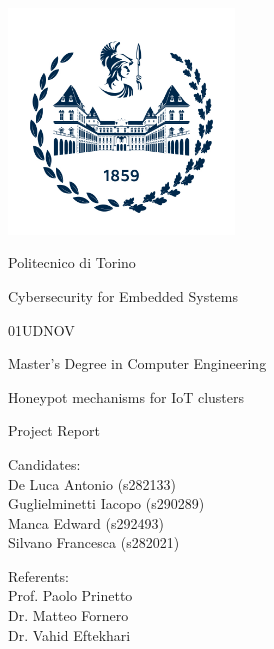 \documentclass[10pt,  english, makeidx, a4paper, titlepage, oneside]{book}
\begin{document}
\frontmatter
\begin{titlepage}
\vspace{0cm}
\centerline{
\includegraphics[width=6cm]{./logopolitonuovo}} 
\vspace{0.5cm}
\centerline{\LARGE Politecnico di Torino}
\vspace{2.5cm}
\centerline{\huge Cybersecurity for Embedded Systems}
\vspace{0.25cm}
\centerline{\huge 01UDNOV}
\vspace{1cm}
\centerline{\Large Master's Degree in Computer Engineering}
\vspace{2.5cm}
\centerline{\Huge Honeypot mechanisms for IoT clusters}
\bigskip
\centerline{\huge Project Report}
\vspace{2cm}
\vfill
\begin{minipage}{7cm} %
\Large{Candidates:\\
De Luca Antonio (s282133)\\
Guglielminetti Iacopo (s290289)\\
Manca Edward (s292493)\\
Silvano Francesca (s282021)}
\end{minipage}
\hfill
\begin{minipage}{4.4cm}
\Large{Referents: \\
Prof. Paolo Prinetto\\
Dr. Matteo Fornero\\
Dr. Vahid Eftekhari}
\end{minipage}
\end{titlepage}

\tableofcontents
\listoffigures %
\mainmatter




%










    

\appendix


%

\end{document}
